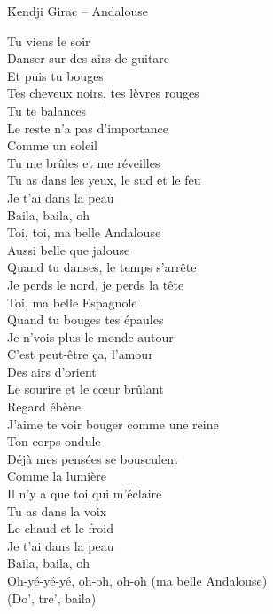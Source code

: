 \documentclass{novel}
\begin{document}
\newpage
\normalsize
\h*{Kendji Girac – Andalouse}
\begin{multicols}{2}
Tu viens le soir \\
Danser sur des airs de guitare \\
Et puis tu bouges \\
Tes cheveux noirs, tes lèvres rouges \\
Tu te balances \\
Le reste n'a pas d'importance \\
Comme un soleil \\
Tu me brûles et me réveilles \\
Tu as dans les yeux, le sud et le feu \\
Je t'ai dans la peau \\

Baila, baila, oh \\

Toi, toi, ma belle Andalouse \\
Aussi belle que jalouse \\
Quand tu danses, le temps s'arrête \\
Je perds le nord, je perds la tête \\
Toi, ma belle Espagnole \\
Quand tu bouges tes épaules \\
Je n'vois plus le monde autour \\
C'est peut-être ça, l'amour \\

Des airs d'orient \\
Le sourire et le cœur brûlant \\
Regard ébène \\
J'aime te voir bouger comme une reine \\
Ton corps ondule \\
Déjà mes pensées se bousculent \\
Comme la lumière \\
Il n'y a que toi qui m'éclaire \\
Tu as dans la voix \\
Le chaud et le froid \\
Je t'ai dans la peau \\

Baila, baila, oh \\

Oh-yé-yé-yé, oh-oh, oh-oh (ma belle Andalouse) \\
(Do’, tre’, baila) \\


\end{multicols}
\end{document}
